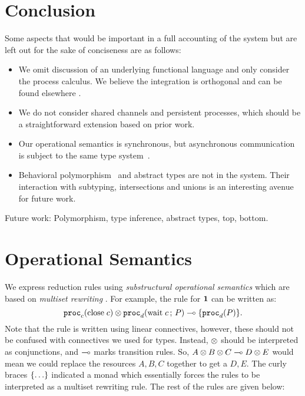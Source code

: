 \documentclass[a4paper,USenglish]{lipics-v2016}
\begin{document}
\section{Conclusion}
\label{conclusion}

Some aspects that would be important in a full accounting of the system but are left out for the sake of conciseness are as follows:
\begin{itemize}
  \item We omit discussion of an underlying functional language and only consider the process calculus. We believe the integration is orthogonal and can be found elsewhere \cite{ToninhoCP13,Toninho15phd,Griffith16phd}.
  \item We do not consider shared channels and persistent processes, which should be a straightforward extension based on prior work. \cite{CairesP10,PfenningG15}
  \item Our operational semantics is synchronous, but asynchronous communication~\cite{DeYoung12csl} is subject to the same type system~\cite{PfenningG15,Griffith16phd}.
  \item Behavioral polymorphism~\cite{Caires13esop} and abstract types are not in the system. Their interaction with subtyping, intersections and unions is an interesting avenue for future work.
\end{itemize}


Future work:
Polymorphism, type inference, abstract types, top, bottom.


\appendix

\section{Operational Semantics}
\label{operational-semantics}

We express reduction rules using \emph{substructural operational semantics} \cite{Simmons12} which are based on \emph{multiset rewriting} \cite{Cervesato06}. For example, the rule for $\mathbf{1}$ can be written as:
$$ \mathtt{proc}_{c}(\mathrm{close}\;c) \otimes \mathtt{proc}_{d}(\mathrm{wait}\;c \,;\, P) \multimap \lbrace\mathtt{proc}_{d}(P)\rbrace. $$
Note that the rule is written using linear connectives, however, these should not be confused with connectives we used for types. Instead, $\otimes$ should be interpreted as conjunctions, and $\multimap$ marks transition rules. So, $A \otimes B \otimes C \multimap D \otimes E$ would mean we could replace the resources $A, B, C$ together to get a $D, E$. The curly braces $\lbrace\ldots\rbrace$ indicated a monad which essentially forces the rules to be interpreted as a multiset rewriting rule. The rest of the rules are given below:
\end{document}
